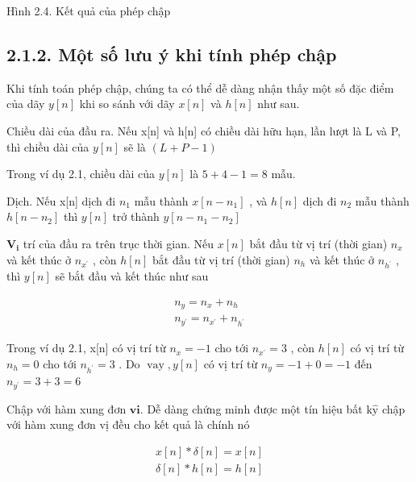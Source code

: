 \documentclass[
  10
]{article}
\begin{document}
Hình 2.4. Kết quả của phép chập

\subsection{2.1.2. Một số lưu ý khi tính phép
chập}\label{mux1ed9t-sux1ed1-lux1b0u-uxfd-khi-tuxednh-phuxe9p-chux1eadp}

Khi tính toán phép chập, chúng ta có thể dễ dàng nhận thấy một số đặc
điểm của dãy \(y [ n ]\) khi so sánh với dãy \(x [ n ]\) và \(h [ n ]\)
như sau.

Chiều dài của đầu ra. Nếu x{[}n{]} và h{[}n{]} có chiều dài hữu hạn, lần
lượt là L và P, thì chiều dài của \(y [ n ]\) sẽ là
\(\left( L + P - 1 \right)\)

Trong ví dụ 2.1, chiều dài của \(y [ n ]\) là \(5 + 4 - 1 = 8\) mẫu.

Dịch. Nếu x{[}n{]} dịch đi \(n _ { 1 }\) mẫu thành
\(x [ n - n _ { 1 } ]\) , và \(h [ n ]\) dịch đi \(n _ { 2 }\) mẫu thành
\(h [ n - n _ { 2 } ]\) thì \(y [ n ]\) trở thành
\(y [ n - n _ { 1 } - n _ { 2 } ]\)

\(\mathbf { V _ { i } }\) trí của đầu ra trên trục thời gian. Nếu
\(x [ n ]\) bắt đầu từ vị trí (thời gian) \(n _ { x }\) và kết thúc ở
\(n _ { x ^ { \prime } }\) , còn \(h [ n ]\) bắt đầu từ vị trí (thời
gian) \(n _ { h }\) và kết thúc ở \(n _ { h ^ { \prime } }\) , thì
\(y [ n ]\) sẽ bắt đầu và kết thúc như sau

\[
\begin{array}{c} {n _ {y} = n _ {x} + n _ {h}} \\ {n _ {y ^ {\prime}} = n _ {x ^ {\prime}} + n _ {h ^ {\prime}}} \end{array}
\]

Trong ví dụ 2.1, x{[}n{]} có vị trí từ \(n _ { x } = - 1\) cho tới
\(n _ { x ^ { \prime } } = 3\) , còn \(h [ n ]\) có vị trí từ
\(n _ { h } = 0\) cho tới \(n _ { h ^ { \prime } } = 3\) . Do
\(\operatorname { v a y } , y [ n ]\) có vị trí từ
\(n _ { y } = - 1 + 0 = - 1\) đến \(n _ { y ^ { \prime } } = 3 + 3 = 6\)

Chập với hàm xung đơn \(\mathbf { v i } .\) Dễ dàng chứng minh được một
tín hiệu bất \(\mathrm { k } \mathrm { \hat { y } }\) chập với hàm xung
đơn vị đều cho kết quả là chính nó

\[
\begin{array}{l} {x [ n ] * \delta [ n ] = x [ n ]} \\ {\delta [ n ] * h [ n ] = h [ n ]} \end{array}
\]
\end{document}
